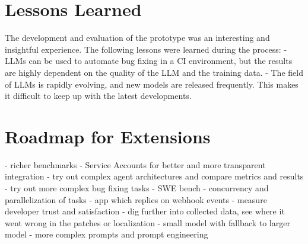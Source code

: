 \section{Lessons Learned}
The development and evaluation of the prototype was an interesting and insightful experience. The following lessons were learned during the process:
- LLMs can be used to automate bug fixing in a CI environment, but the results are highly dependent on the quality of the LLM and the training data.
- The field of LLMs is rapidly evolving, and new models are released frequently. This makes it difficult to keep up with the latest developments.


\section{Roadmap for Extensions} \label{section:roadmap}
- richer benchmarks
- Service Accounts for better and more transparent integration
- try out complex agent architectures and compare metrics and results
- try out more complex bug fixing tasks - SWE bench
- concurrency and parallelization of tasks
- app which replies on webhook events
- measure developer trust and satisfaction
- dig further into collected data, see where it went wrong in the patches or localization
- small model with fallback to larger model
- more complex prompts and prompt engineering